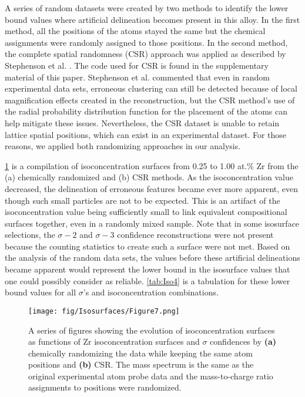 		A series of random datasets were created by two methods to identify the lower bound values where artificial delineation becomes present in this alloy. In the first method, all the positions of the atoms stayed the same but the chemical assignments were randomly assigned to those positions. In the second method, the complete spatial randomness (CSR) approach was applied as described by Stephenson et al. \cite{RN1114}. The code used for CSR is found in the supplementary material of this paper. Stephenson et al. commented that even in random experimental data sets, erroneous clustering can still be detected because of local magnification effects created in the reconstruction, but the CSR method’s use of the radial probability distribution function for the placement of the atoms can help mitigate these issues. Nevertheless, the CSR dataset is unable to retain lattice spatial positions, which can exist in an experimental dataset. For those reasons, we applied both randomizing approaches in our analysis.
		 
		\ref{fig:Iso7} is a compilation of isoconcentration surfaces from 0.25 to 1.00 at.\% Zr from the (a) chemically randomized and (b) CSR methods. As the isoconcentration value decreased, the delineation of erroneous features became ever more apparent, even though such small particles are not to be expected. This is an artifact of the isoconcentration value being sufficiently small to link equivalent compositional surfaces together, even in a randomly mixed sample. Note that in some isosurface selections, the $\sigma-2${} and $\sigma-3${} confidence reconstructions were not present because the counting statistics to create such a surface were not met. Based on the analysis of the random data sets, the values before these artificial delineations became apparent would represent the lower bound in the isosurface values that one could possibly consider as reliable. \ref{tab:Iso4} is a tabulation for these lower bound values for all $\sigma${}’s and isoconcentration combinations.
			
		\begin{figure}
			\centering
			\texttt{[image: fig/Isosurfaces/Figure7.png]}
			\caption[A series of figures showing the evolution of isoconcentration surfaces as functions of Zr isoconcentration surfaces and $\sigma${} confidences.]{A series of figures showing the evolution of isoconcentration surfaces as functions of Zr isoconcentration surfaces and $\sigma${} confidences by \textbf{(a)} chemically randomizing the data while keeping the same atom positions and
				\textbf{(b)} CSR. The
				mass spectrum is the same as the original experimental atom probe data and the
				mass-to-charge ratio assignments to positions were randomized.}
			\label{fig:Iso7}
		\end{figure}	
			
